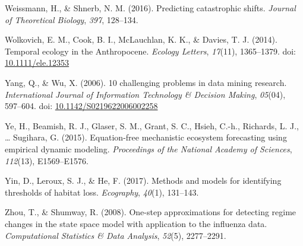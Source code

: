 \documentclass[12pt,twoside,openany]{reedthesis}
\begin{document}
\leavevmode\hypertarget{ref-weissmann2016predicting}{}%
Weissmann, H., \& Shnerb, N. M. (2016). Predicting catastrophic shifts. \emph{Journal of Theoretical Biology}, \emph{397}, 128--134.

\leavevmode\hypertarget{ref-wolkovich_temporal_2014}{}%
Wolkovich, E. M., Cook, B. I., McLauchlan, K. K., \& Davies, T. J. (2014). Temporal ecology in the Anthropocene. \emph{Ecology Letters}, \emph{17}(11), 1365--1379. doi: \href{https://doi.org/10.1111/ele.12353}{10.1111/ele.12353}

\leavevmode\hypertarget{ref-yang_10_2006}{}%
Yang, Q., \& Wu, X. (2006). 10 challenging problems in data mining research. \emph{International Journal of Information Technology \& Decision Making}, \emph{05}(04), 597--604. doi: \href{https://doi.org/10.1142/S0219622006002258}{10.1142/S0219622006002258}

\leavevmode\hypertarget{ref-ye2015equation}{}%
Ye, H., Beamish, R. J., Glaser, S. M., Grant, S. C., Hsieh, C.-h., Richards, L. J., \ldots{} Sugihara, G. (2015). Equation-free mechanistic ecosystem forecasting using empirical dynamic modeling. \emph{Proceedings of the National Academy of Sciences}, \emph{112}(13), E1569--E1576.

\leavevmode\hypertarget{ref-yin2017methods}{}%
Yin, D., Leroux, S. J., \& He, F. (2017). Methods and models for identifying thresholds of habitat loss. \emph{Ecography}, \emph{40}(1), 131--143.

\leavevmode\hypertarget{ref-zhou2008one}{}%
Zhou, T., \& Shumway, R. (2008). One-step approximations for detecting regime changes in the state space model with application to the influenza data. \emph{Computational Statistics \& Data Analysis}, \emph{52}(5), 2277--2291.
\end{document}
